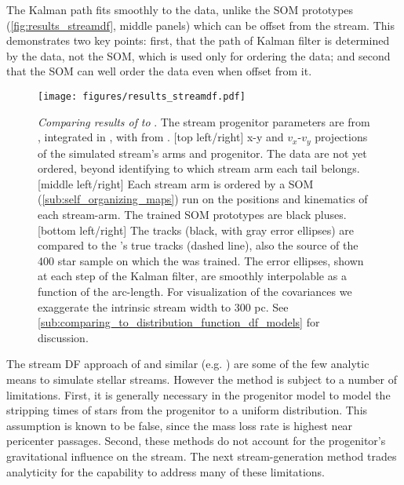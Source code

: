 \documentclass[fleqn,usenatbib]{mnras}
\begin{document}
    The Kalman path fits smoothly to the data, unlike the SOM prototypes
    (\autoref{fig:results_streamdf}, middle panels) which can be offset from the
    stream. This demonstrates two key points: first, that the path of Kalman
    filter is determined by the data, not the SOM, which is used only for
    ordering the data; and second that the SOM can well order the data even when
    offset from it.

    \begin{figure*}
      \centering
      \texttt{[image: figures/results\_streamdf.pdf]}
      \caption{ 
        \emph{Comparing results of} \galpystreamdf{} \citep{Bovy2014} \emph{to}
        \trackstream{}. The stream progenitor parameters are 
        from \citet{Vasiliev2019}, integrated in \galpyMWPotential{}
        \citep{Bovy2015}, with \galpystreamdf{} from \citet{Bovy2014} .
        [top left/right] x-y and $v_x$-$v_y$ projections of the simulated
        stream's arms and progenitor. The data are not yet ordered, beyond
        identifying to which stream arm each tail belongs.
        [middle left/right] Each stream arm is ordered by a SOM
        (\autoref{sub:self_organizing_maps}) run on the positions and kinematics
        of each stream-arm. The trained SOM prototypes are black pluses.
        [bottom left/right] The \trackstream{} tracks (black, with gray error
        ellipses) are compared to the \galpystreamdf's true tracks (dashed
        line), also the source of the 400 star sample on which the
        \trackstream{} was trained. The error ellipses, shown at each step of
        the Kalman filter, are smoothly interpolable as a function of the
        arc-length. For visualization of the covariances we exaggerate the
        intrinsic stream width to 300 pc. See
        \autoref{sub:comparing_to_distribution_function_df_models} for
        discussion.
        \label{fig:results_streamdf}
      }
    \end{figure*}

    The stream DF approach of \citet{Bovy2014} and similar (e.g.
    \citet{Sanders:2014}) are some of the few analytic means to simulate stellar
    streams. However the method is subject to a number of limitations. First, it
    is generally necessary in the progenitor model to model the stripping times
    of stars from the progenitor to a uniform distribution. This assumption is
    known to be false, since the mass loss rate is highest near pericenter
    passages. Second, these methods do not account for the progenitor's
    gravitational influence on the stream. The next stream-generation method
    trades analyticity for the capability to address many of these limitations.
\end{document}
